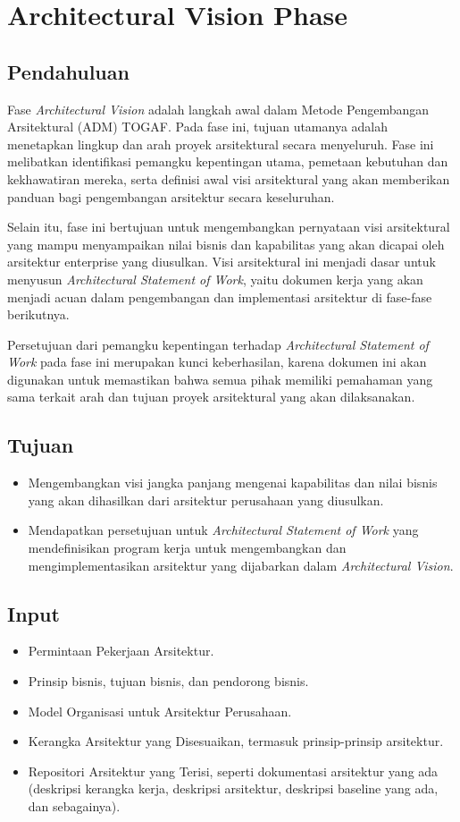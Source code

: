 \chapter{Architectural Vision Phase}

\section{Pendahuluan}
Fase \textit{Architectural Vision} adalah langkah awal dalam Metode Pengembangan Arsitektural (ADM) TOGAF. Pada fase ini, tujuan utamanya adalah menetapkan lingkup dan arah proyek arsitektural secara menyeluruh. Fase ini melibatkan identifikasi pemangku kepentingan utama, pemetaan kebutuhan dan kekhawatiran mereka, serta definisi awal visi arsitektural yang akan memberikan panduan bagi pengembangan arsitektur secara keseluruhan.

Selain itu, fase ini bertujuan untuk mengembangkan pernyataan visi arsitektural yang mampu menyampaikan nilai bisnis dan kapabilitas yang akan dicapai oleh arsitektur enterprise yang diusulkan. Visi arsitektural ini menjadi dasar untuk menyusun \textit{Architectural Statement of Work}, yaitu dokumen kerja yang akan menjadi acuan dalam pengembangan dan implementasi arsitektur di fase-fase berikutnya. 

Persetujuan dari pemangku kepentingan terhadap \textit{Architectural Statement of Work} pada fase ini merupakan kunci keberhasilan, karena dokumen ini akan digunakan untuk memastikan bahwa semua pihak memiliki pemahaman yang sama terkait arah dan tujuan proyek arsitektural yang akan dilaksanakan.


\section{Tujuan}
\begin{itemize}
	\item Mengembangkan visi jangka panjang mengenai kapabilitas dan nilai bisnis yang akan dihasilkan dari arsitektur perusahaan yang diusulkan.
	\item Mendapatkan persetujuan untuk \textit{Architectural Statement of Work} yang mendefinisikan program kerja untuk mengembangkan dan mengimplementasikan arsitektur yang dijabarkan dalam \textit{Architectural Vision}.
\end{itemize}

\section{Input}
\begin{itemize}
	\item Permintaan Pekerjaan Arsitektur.
	\item Prinsip bisnis, tujuan bisnis, dan pendorong bisnis.
	\item Model Organisasi untuk Arsitektur Perusahaan.
	\item Kerangka Arsitektur yang Disesuaikan, termasuk prinsip-prinsip arsitektur.
	\item Repositori Arsitektur yang Terisi, seperti dokumentasi arsitektur yang ada (deskripsi kerangka kerja, deskripsi arsitektur, deskripsi baseline yang ada, dan sebagainya).
\end{itemize}

